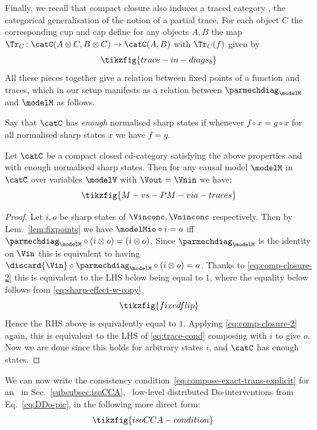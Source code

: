 \documentclass{article}
\begin{document}
{Finally, we recall that compact closure also induces a traced category \cite{selinger2010survey}, the categorical generalisation of the notion of a partial trace. 
For each object $C$ the corresponding cup and cap define for any objects $A,B$ the map $\Tr_C \colon \catC(A\otimes C, B \otimes C) \rightarrow \catC(A, B)$ with $\Tr_C(f)$ given by 
\begin{equation}
	\tikzfig{trace-in-diags_b}
\end{equation} 
All these pieces together give a relation between fixed points of a function and traces, which in our setup manifests as a relation between $\parmechdiag_\modelM$ and $\modelM$ as follows. 

Say that $\catC$ has \emph{enough} normalised sharp states if whenever $f \circ x = g \circ x$ for all normalised sharp states $x$ we have $f = g$.

\begin{lemma}
Let $\catC$ be a compact closed cd-category satisfying the above properties and with enough normalised sharp states. Then for any causal model $\modelM$ in $\catC$ over variables $\modelV$ with $\Vout=\Vnin$ we have: 
\begin{equation} \label{eq:trace-cond}
	\tikzfig{M-vs-PM-via-traces}
\end{equation}
\end{lemma}

\begin{proof}
Let $i, o$ be sharp states of $\Vinconc, \Vninconc$ respectively. Then by Lem.~\ref{lem:fixpoints} we have $\modelMio \circ i = o$ iff $\parmechdiag_\modelM \circ (i \otimes o) = (i \otimes o)$. Since $\parmechdiag_\modelM$ is the identity on $\Vin$ this is equivalent to having $\discard{\Vin} \circ \parmechdiag_\modelM \circ (i\otimes o) = o$. Thanks to \eqref{eq:comp-closure-2} this is equivalent to the LHS below being equal to $1$, where the equality below follows from \eqref{eq:sharp-effect-w-copy}.  
\[
\tikzfig{fixedflip}
\]
Hence the RHS above is equivalently equal to $1$. Applying \eqref{eq:comp-closure-2} again, this is equivalent to the LHS of \eqref{eq:trace-cond} composing with $i$ to give $o$. Now we are done since this holds for arbitrary states $i$, and $\catC$ has enough states.
\end{proof}


\color{black}
We can now write the consistency condition~\eqref{eq:compose-exact-trans-explicit} for an \isoCCA\ in Sec.~\ref{subsubsec:isoCCA}, \ low-level distributed Do-interventions from Eq.~\eqref{eq:DDo-pic}, in the following more direct form: 
\begin{equation}
	\hspace*{-0.5cm} \tikzfig{isoCCA-condition} \nonumber
\end{equation}

}
\end{document}
